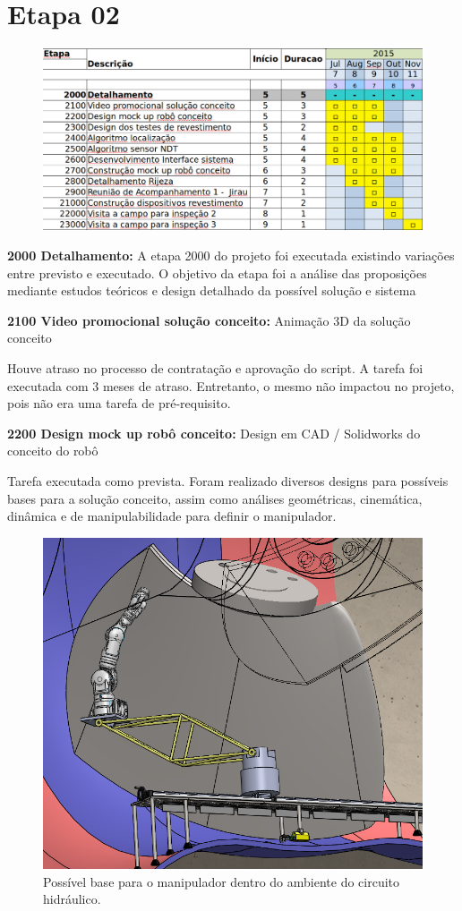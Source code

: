 \section{Etapa 02}

\begin{figure}[H]
\centering
\includegraphics[width=0.9\columnwidth]{figs/etapa2}
\end{figure} 

\textbf{2000 Detalhamento:} A etapa 2000 do projeto foi executada existindo
variações entre previsto e executado. O objetivo da etapa foi a análise das
proposições mediante estudos teóricos e design detalhado da possível solução e sistema

\textbf{2100 Video promocional solução conceito:} Animação 3D da solução
conceito

Houve atraso no processo de contratação e aprovação do script. A tarefa foi
executada com 3 meses de atraso. Entretanto, o mesmo não impactou no projeto,
pois não era uma tarefa de pré-requisito.

\textbf{2200 Design mock up robô conceito:} Design em CAD / Solidworks do
conceito do robô

Tarefa executada como prevista. Foram realizado diversos designs para possíveis
bases para a solução conceito, assim como análises geométricas, cinemática,
dinâmica e de manipulabilidade para definir o manipulador.

\begin{figure}\centering
\includegraphics[width=0.6\columnwidth]{figs/EMMA_Base_Conceito_PRR}
\caption{Possível base para o manipulador dentro do ambiente do circuito
hidráulico.}
\end{figure} 


